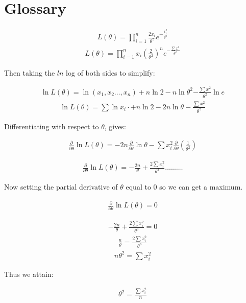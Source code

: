 \documentclass{article}
\begin{document}
\section{Glossary}\label{glossary}

\begin{align}
    L(\theta) = \prod_{i=1}^n\frac{2x_{i}}{\theta^2}e^{-\frac{x_{i}^2}{\theta^2}}
\end{align}
\begin{align}
    L(\theta) = \prod_{i=1}^n x_{i}(\frac{2}{\theta^2})^n e^{-\frac{\sum{x^2}}{\theta^2}}
\end{align}

Then taking the $ln$ log of both sides to simplify:

\begin{align}
    \ln{L(\theta)}= \ln{(x_{1},x_{2}\dots,x_{n})} + n\ln{2} - n\ln\theta^2 {-\frac{\sum{x^2}}{\theta^2}}\ln{e}
\end{align}
\begin{align}
    \ln{L(\theta)}= \sum\ln{x_{i}} \cdot + n\ln{2} - 2n\ln{\theta} -\frac{\sum{x^2}}{\theta^2}
\end{align}

Differentiating with respect to $\theta$, gives:

\begin{align}
    \frac{\partial }{\partial \theta}\ln L{(\theta)} = -2n\frac{\partial}{\partial\theta}\ln\theta - \sum x_{i}^2\frac{\partial}{\partial\theta}(\frac{1}{\theta^2})
\end{align}

\begin{align}
    \frac{\partial }{\partial \theta}\ln L{(\theta)} = -\frac{2n}{\theta} + \frac{2\sum x_{i}^2}{\theta^3} \dots \dots \dots
\end{align}

Now setting the partial derivative of $\theta$ equal to $0$ so we can get a maximum.

\begin{align}
    \frac{\partial }{\partial \theta}\ln L{(\theta)} = 0
\end{align}

\begin{align}
    -\frac{2n}{\theta} + \frac{2\sum x_{i}^2}{\theta^3} = 0
\end{align}
\begin{align}
    \frac{n}{\theta} = \frac{2\sum x_{i}^2}{\theta^3}
\end{align}
\begin{align}
   n\theta^2= \sum x_{i}^2
\end{align}

Thus we attain:

\begin{align}
    \theta^2 = \frac{\sum x_{i}^2}{n}
\end{align}





\end{document}
